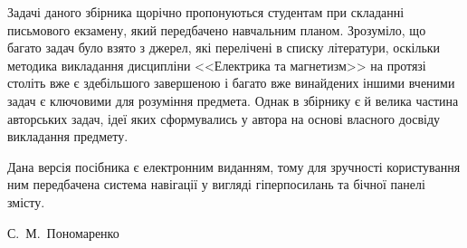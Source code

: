 Задачі даного збірника щорічно пропонуються студентам при складанні письмового екзамену, який передбачено навчальним планом. Зрозуміло, що багато задач було взято з джерел, які перелічені в списку літератури, оскільки методика викладання дисципліни <<Електрика та магнетизм>> на протязі століть вже є здебільшого завершеною і багато вже винайдених іншими вченими задач є ключовими для розуміння предмета. Однак в збірнику є й велика частина авторських задач, ідеї яких сформувались у автора на основі власного досвіду викладання предмету.

Дана версія посібника є електронним виданням, тому для зручності користування ним передбачена система навігації у вигляді гіперпосилань та бічної панелі змісту.

\vspace*{4em}

\begin{flushright}\Annabelle
	С.~М.~Пономаренко
\end{flushright}
\introfalse





